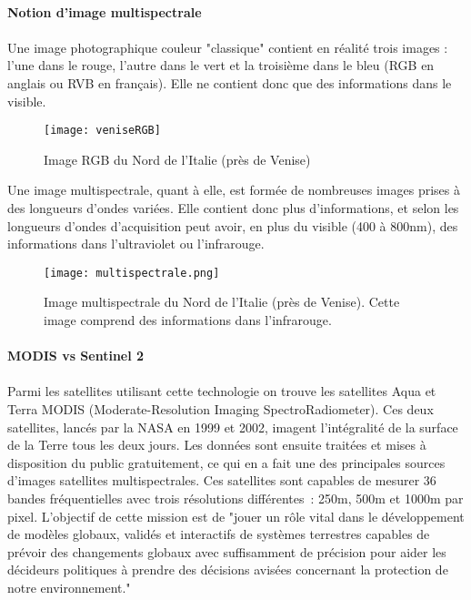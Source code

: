 \paragraph{Notion d'image multispectrale}
\paragraph{}
Une image photographique couleur "classique" contient en réalité trois images : l'une dans le rouge, l'autre dans le vert et la troisième dans le bleu (RGB en anglais ou RVB en français). Elle ne contient donc que des informations dans le visible. 
\begin{figure}[H]
  \centering
    \texttt{[image: veniseRGB]}
  \caption{Image RGB du Nord de l'Italie (près de Venise)}
  \label{fig:veniseRGB}
\end{figure}

Une image multispectrale, quant à elle, est formée de nombreuses images prises à des longueurs d'ondes variées. Elle contient donc plus d'informations, et selon les longueurs d'ondes d'acquisition peut avoir, en plus du visible (400 à 800nm), des informations dans l'ultraviolet ou l'infrarouge.

\begin{figure}[H]
  \centering
    \texttt{[image: multispectrale.png]}
  \caption{Image multispectrale du Nord de l'Italie (près de Venise). Cette image comprend des informations dans l'infrarouge.}
  \label{fig:veniseMulti}
\end{figure}

\paragraph{MODIS vs Sentinel 2}
\paragraph{}
Parmi les satellites utilisant cette technologie on trouve les satellites Aqua et Terra MODIS (Moderate-Resolution Imaging SpectroRadiometer). Ces deux satellites, lancés par la NASA en 1999 et 2002, imagent l'intégralité de la surface de la Terre tous les deux jours. Les données sont ensuite traitées et mises à disposition du public gratuitement, ce qui en a fait une des principales sources d'images satellites multispectrales. Ces satellites sont capables de mesurer 36 bandes fréquentielles avec trois résolutions différentes : 250m, 500m et 1000m par pixel. L'objectif de cette mission est de "jouer un rôle vital dans le développement de modèles globaux, validés et interactifs de systèmes terrestres capables de prévoir des changements globaux avec suffisamment de précision pour aider les décideurs politiques à prendre des décisions avisées concernant la protection de notre environnement."\cite{nasa}

